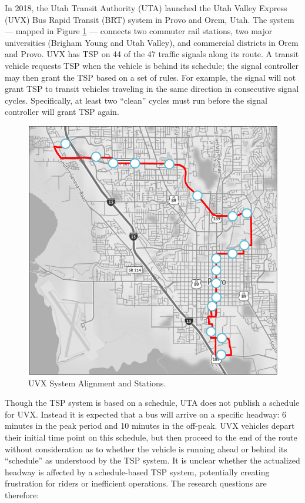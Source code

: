 \documentclass[3p, authoryear, review]{elsarticle} %
\begin{document}
In 2018, the Utah Transit Authority (UTA) launched the Utah Valley Express (UVX)
Bus Rapid Transit (BRT) system in Provo and Orem, Utah. The system --- mapped in Figure \ref{fig:uvxmap} --- connects
two commuter rail stations, two major universities (Brigham Young and Utah Valley),
and commercial districts in Orem and Provo. UVX has TSP on 44 of the 47 traffic
signals along its route. A transit vehicle requests TSP when the vehicle is behind its
schedule; the signal controller may then grant the TSP based on a set of rules.
For example, the signal will not grant TSP to transit vehicles traveling in the
same direction in consecutive signal cycles. Specifically, at least two ``clean'' cycles
must run before the signal controller will grant TSP again.

\begin{figure}
\centering
\includegraphics{uvx_headways_files/figure-latex/uvxmap-1.pdf}
\caption{\label{fig:uvxmap}UVX System Alignment and Stations.}
\end{figure}

Though the TSP system is based on a schedule, UTA does not publish a schedule
for UVX. Instead it is expected that a bus will arrive on a specific
headway: 6 minutes in the peak period and 10 minutes in the off-peak. UVX vehicles depart
their initial time point on this schedule, but then proceed to the end of the route
without consideration as to whether the vehicle is running ahead or behind its ``schedule''
as understood by the TSP system. It is
unclear whether the actualized headway is affected by a schedule-based TSP
system, potentially creating frustration for riders or inefficient operations.
The research questions are therefore:
\end{document}
